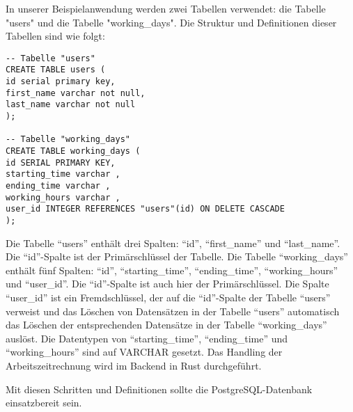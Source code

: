In unserer Beispielanwendung werden zwei Tabellen verwendet: die Tabelle "users" und die Tabelle "working\_days". Die Struktur und Definitionen dieser Tabellen sind wie folgt:

\begin{verbatim}
-- Tabelle "users"
CREATE TABLE users (
id serial primary key,
first_name varchar not null,
last_name varchar not null
);

-- Tabelle "working_days"
CREATE TABLE working_days (
id SERIAL PRIMARY KEY,
starting_time varchar ,
ending_time varchar ,
working_hours varchar ,
user_id INTEGER REFERENCES "users"(id) ON DELETE CASCADE
);
\end{verbatim}

Die Tabelle \enquote{users} enthält drei Spalten: \enquote{id}, \enquote{first\_name} und \enquote{last\_name}. Die \enquote{id}-Spalte ist der Primärschlüssel der Tabelle. 
Die Tabelle \enquote{working\_days} enthält fünf Spalten: \enquote{id}, \enquote{starting\_time}, \enquote{ending\_time}, \enquote{working\_hours} und \enquote{user\_id}. Die \enquote{id}-Spalte ist auch hier der Primärschlüssel. Die Spalte \enquote{user\_id} ist ein Fremdschlüssel, der auf die \enquote{id}-Spalte der Tabelle \enquote{users} verweist und das Löschen von Datensätzen in der Tabelle \enquote{users} automatisch das Löschen der entsprechenden Datensätze in der Tabelle \enquote{working\_days} auslöst.
Die Datentypen von \enquote{starting\_time}, \enquote{ending\_time} und \enquote{working\_hours} sind auf VARCHAR gesetzt. Das Handling der Arbeitszeitrechnung wird im Backend in Rust durchgeführt. 

Mit diesen Schritten und Definitionen sollte die PostgreSQL-Datenbank einsatzbereit sein.